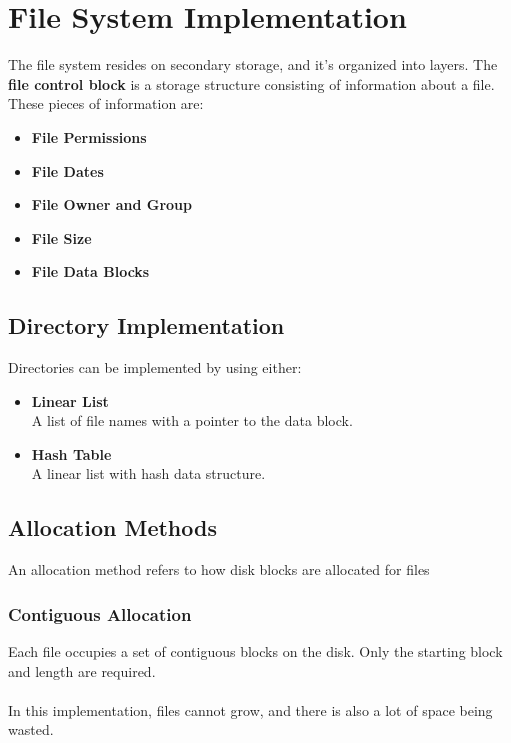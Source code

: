 \documentclass{article}
\begin{document}
\section{File System Implementation}
The file system resides on secondary storage, and it's organized into layers. The \textbf{file control block} is a storage structure consisting of information about a file. These pieces of information are:

\begin{itemize}
	\item \textbf{File Permissions}
	\item \textbf{File Dates}
	\item \textbf{File Owner and Group}
	\item \textbf{File Size}
	\item \textbf{File Data Blocks}
\end{itemize}

\subsection{Directory Implementation}
Directories can be implemented by using either:

\begin{itemize}
	\item \textbf{Linear List}
	\vspace{.2cm} \\
	A list of file names with a pointer to the data block.
	
	\item \textbf{Hash Table}
	\vspace{.2cm} \\
	A linear list with hash data structure.
\end{itemize}

\subsection{Allocation Methods}
An allocation method refers to how disk blocks are allocated for files

\subsubsection{Contiguous Allocation}
Each file occupies a set of contiguous blocks on the disk. Only the starting block and length are required. \\ \\
In this implementation, files cannot grow, and there is also a lot of space being wasted.
\end{document}
